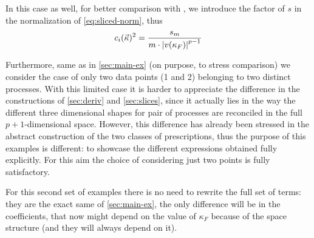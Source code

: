 In this case as well, for better comparison with \cite{NNPDF:2019ubu}, we
introduce the factor of $s$ in the normalization of \cref{eq:sliced-norm}, thus
\begin{equation}
    c_i(\vec{\kappa})^2 = \frac{s_m}{m \cdot \abs{v(\kappa_F)}^{p-1}}
\end{equation}

Furthermore, same as in \cref{sec:main-ex} (on purpose, to stress comparison)
we consider the case of only two data points (1 and 2) belonging to two
distinct processes.
With this limited case it is harder to appreciate the difference in the
constructions of \cref{sec:deriv} and \cref{sec:slices}, since it actually lies
in the way the different three dimensional shapes for pair of processes are
reconciled in the full $p+1$-dimensional space.
However, this difference has already been stressed in the abstract construction
of the two classes of prescriptions, thus the purpose of this examples is
different: to showcase the different expressions obtained fully explicitly.
For this aim the choice of considering just two points is fully satisfactory.

For this second set of examples there is no need to rewrite the full set of
terms: they are the exact same of \cref{sec:main-ex}, the only difference will
be in the coefficients, that now might depend on the value of $\kappa_F$
because of the space structure (and they will always depend on it).


